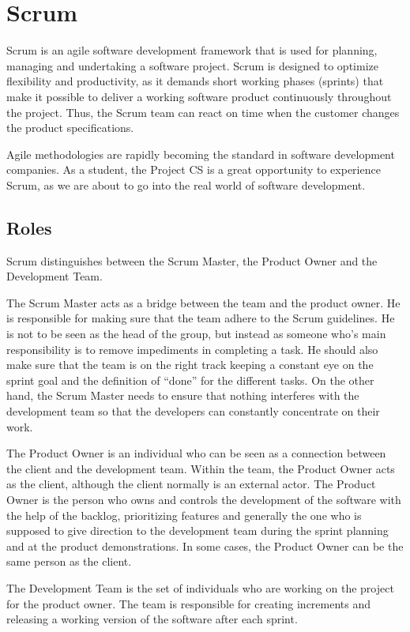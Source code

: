 \section{Scrum}
\label{sec:scrum}
Scrum is an agile software development framework that is used for planning, managing
and undertaking a software project. Scrum is designed to optimize flexibility and productivity,
as it demands short working phases (sprints) that make it possible to deliver
a working software product continuously throughout the project. Thus, the Scrum team
can react on time when the customer changes the product specifications.

Agile methodologies are rapidly becoming the standard
in software development companies. As a student, the Project CS is a great opportunity
to experience Scrum, as we are about to go into the real world of software development.

\subsection{Roles}

Scrum distinguishes between the Scrum Master, the Product Owner and the Development Team.

The Scrum Master acts as a bridge between the team and the product owner. 
He is responsible for making sure that the team adhere to the Scrum guidelines. He is not to be seen as the head of the group, but instead as someone who's main responsibility is to remove impediments in completing a task.
He should also make sure that the team is on the right track keeping a constant eye on the sprint goal
and the definition of ``done'' for the different tasks. On the other hand, the Scrum Master
needs to ensure that nothing interferes with the development team so that the developers
can constantly concentrate on their work.

The Product Owner is an individual who can be seen as a connection between the client and
the development team. Within the team, the Product Owner acts as the client, although the client normally is an external actor.
The Product Owner is the person who owns and controls the development of the software with the help of the backlog,
prioritizing features and generally the one who is supposed to give direction to the development team during the sprint planning and at the product demonstrations.
In some cases, the Product Owner can be the same person as the client.

The Development Team is the set of individuals who are working on the project for the product owner.
The team is responsible for creating increments and releasing a working version of the software
after each sprint.


